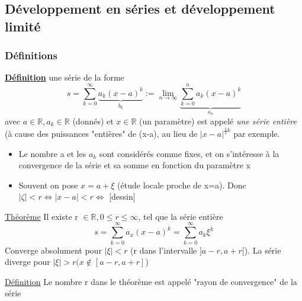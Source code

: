 \documentclass[12pt,a4paper]{article}
\newcommand{\somme}[2]{\ensuremath{\sum\limits_{#2}^{#1}}}
\newcommand{\limite}{\lim\limits_}
\newcommand{\evid}[1]{\textbf{\underline{#1}}}
\newcommand{\ninf}{\ensuremath{n \to \infty}}
\newcommand{\R}{\ensuremath{\mathbb{R}} }
\newcommand{\Theoreme}{\underline{Théorème} }
\newcommand{\Definition}{\underline{Définition} }
\begin{document}
{\subsection{Développement en séries et développement limité}
\subsubsection{Définitions}
\begin{boite}
	\evid{Définition} une série de la forme
	\begin{equation}
		s = \somme{\infty}{k=0} \underbrace{a_k (x-a)^k}_{b_k} := \limite{\ninf} \underbrace{\somme{n}{k=0}a_k(x-a)^k}_{s_n}
	\end{equation}
	avec $a\in  \R, a_k \in \R$ (donnés) et $x \in \R$ (un paramètre) est appelé  \textit{une série entière} (à cause des puissances "entières" de (x-a), au lieu de $|x-a|^{\frac{1}{3}k}$ par exemple.
\end{boite}
\begin{itemize}
	\item Le nombre a et les $a_k$ sont considérés comme fixes, et on s'intéresse à la convergence de la série et sa somme en fonction du paramètre x
	\item Souvent on pose $x = a+\xi$ (étude locale proche de x=a). Donc $|\zeta| < r \iff |x-a| < r \iff$ [dessin]
\end{itemize}

\begin{boite}
	\Theoreme Il existe r $\in \R, 0 \leq r \leq \infty$, tel que la série entière 
	\begin{equation}
		s = \somme{\infty}{k=0}{a_x(x-a)^k} = \somme{\infty}{k=0}{a_k\xi^k}
	\end{equation}
	Converge absolument pour $|\xi| < r$ (r dans l'intervalle $]a-r,a+r[$). La série diverge pour $|\xi| > r (x \not \in [a-r,a+r]$)
\end{boite}
\begin{boite}
	\Definition Le nombre r dans le théorème est appelé "rayon de convergence" de la série
\end{boite}

}
\end{document}
